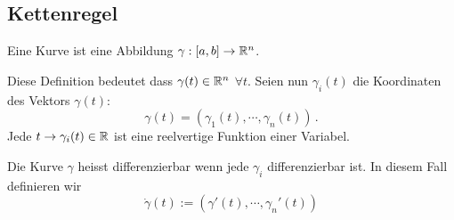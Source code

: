 \subsection{Kettenregel}
\begin{Def}
  Eine Kurve ist eine Abbildung $\gamma:[a,b]\rightarrow\mathbb{R}^n$.  
\end{Def}
Diese Definition bedeutet dass $\gamma(t)\in\mathbb{R}^n$ $\forall t$.
Seien nun $\gamma_i (t)$ die Koordinaten des Vektors $\gamma (t)$:
  \[\gamma(t)=(\gamma_1(t),\cdots,\gamma_n(t))\, .\]
Jede $t\rightarrow\gamma_i(t)\in\mathbb{R}$ ist eine reelvertige Funktion einer Variabel.

\begin{Def}
Die Kurve $\gamma$ heisst differenzierbar wenn jede $\gamma_i$ differenzierbar ist.
In diesem Fall definieren wir
  \[\dot{\gamma} (t):=(\gamma'(t),\cdots,\gamma_n'(t))\]
\end{Def}

